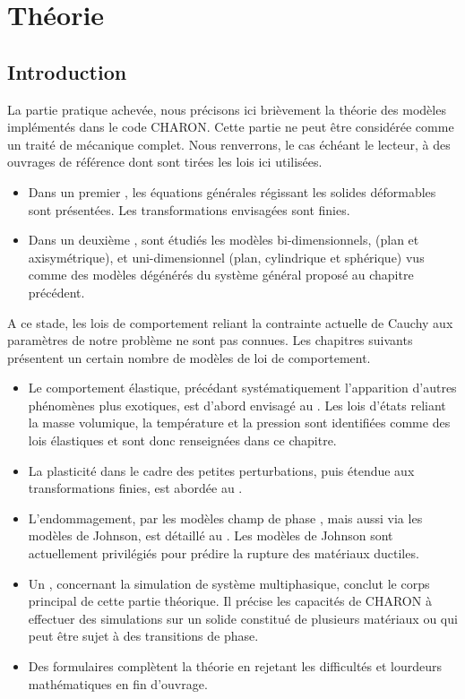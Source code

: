 \documentclass[10pt]{book}
\begin{document}
\part{Théorie}\label{Part:Theorie}
\chapter*{Introduction}
La partie pratique achevée, nous précisons ici brièvement la théorie des modèles implémentés dans le code CHARON. Cette partie ne peut être considérée comme un traité de mécanique complet. Nous renverrons, le cas échéant le lecteur, à des ouvrages de référence dont sont tirées les lois ici utilisées.
\begin{itemize}[label=$\star$]
\item Dans un premier , les équations générales régissant les solides déformables sont présentées. Les transformations envisagées sont finies. 
\item Dans un deuxième , sont étudiés les modèles bi-dimensionnels, (plan et axisymétrique), et uni-dimensionnel (plan, cylindrique et sphérique) vus comme des modèles dégénérés du système général proposé au chapitre précédent.
\end{itemize}
A ce stade, les lois de comportement reliant la contrainte actuelle de Cauchy aux paramètres de notre problème ne sont pas connues. Les chapitres suivants présentent un certain nombre de modèles de loi de comportement.
\begin{itemize}[label=$\star$]
\item Le comportement élastique, précédant systématiquement l'apparition d'autres phénomènes plus exotiques, est d'abord envisagé au . Les lois d'états reliant la masse volumique, la température et la pression sont identifiées comme des lois élastiques et sont donc renseignées dans ce chapitre.
\item La plasticité dans le cadre des petites perturbations, puis étendue aux transformations finies, est abordée au .
\item L'endommagement, par les modèles \og champ de phase \fg{}, mais aussi via les modèles de Johnson, est détaillé au . Les modèles de Johnson sont actuellement privilégiés pour prédire la rupture des matériaux ductiles.
\item Un , concernant la simulation de système multiphasique, conclut le corps principal de cette partie théorique. Il précise les capacités de CHARON à effectuer des simulations sur un solide constitué de plusieurs matériaux ou qui peut être sujet à des transitions de phase.
\item Des formulaires  complètent la théorie en rejetant les difficultés et lourdeurs mathématiques en fin d'ouvrage.
\end{itemize}
\end{document}
